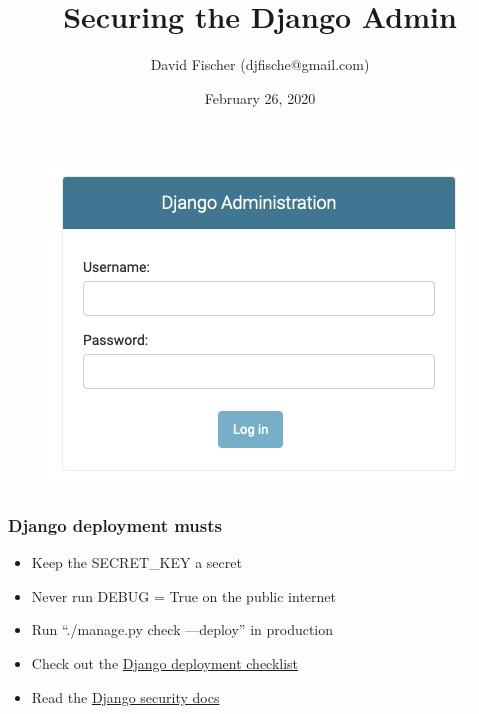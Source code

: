 \documentclass[aspectratio=169]{beamer}
\title{Securing the Django Admin}
\author{David Fischer (djfische@gmail.com)}
\date{February 26, 2020}
\begin{document}
\maketitle


\begin{frame}
  \begin{figure}[p]
    \centering
    \includegraphics[width=0.5\paperwidth]{images/securing-django-admin-login.png}
  \end{figure}
\end{frame}


\begin{frame}
\frametitle{Django deployment musts}
  \begin{itemize}
    \item Keep the SECRET\_KEY a secret
    \item Never run DEBUG = True on the public internet
    \item Run ``./manage.py check —deploy'' in production
    \item Check out the \href{https://docs.djangoproject.com/en/2.2/howto/deployment/checklist/}{Django deployment checklist}
    \item Read the \href{https://docs.djangoproject.com/en/2.2/topics/security/}{Django security docs}
  \end{itemize}
\end{frame}
\end{document}

